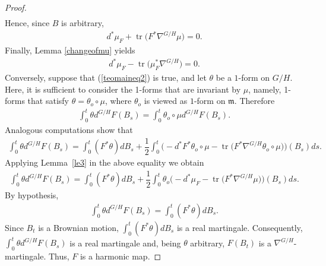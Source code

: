 \documentclass[pdftex]{sigma}
\numberwithin{equation}{section}
\newcommand{\m}{\mathfrak{m}}
\begin{document}
\begin{proof}
\begin{gather*}
  \end{gather*}
  Hence, since $B$ is arbitrary,
  \begin{gather*}
    d^{*}\mu_{F}  +  \operatorname{tr}\big(F^{*} \nabla^{G/H}\mu\big) = 0.
  \end{gather*}
  Finally, Lemma \ref{changeofmu} yields
  \begin{gather}\label{teomaineq2}
    d^{*}\mu_{F}  -  \operatorname{tr}\big(\mu_{F}^* \nabla^{G/H}\big) =0.
  \end{gather}
  Conversely, suppose that (\ref{teomaineq2}) is true, and let $\theta$ be a $1$-form on $G/H$. Here, it is suf\/f\/icient to consider the 1-forms that are invariant by $\mu$, namely, 1-forms that satisfy $\theta = \theta_{o}\circ \mu$, where $\theta_o$ is viewed as $1$-form on  $\m$. Therefore
  \begin{gather*}
    \int_0^t \theta d^{G/H}F(B_{s}) = \int_0^t \theta_{o} \circ \mu  d^{G/H}F(B_{s}).
  \end{gather*}
  Analogous computations show that
  \begin{gather*}
    \int_0^t \theta d^{G/H}F(B_{s}) = \int_0^t (F^{*}\theta) dB_{s} + \dfrac{1}{2}\int_0^t \big({-}d^{*}F^{*}
    \theta_{o}\circ \mu - \operatorname{tr}\big(F^{*} \nabla^{G/H}\theta_{o} \circ \mu\big)\big)(B_{s})ds.
  \end{gather*}
  Applying Lemma~\ref{le3} in the above equality we obtain
  \begin{gather*}
    \int_0^t \theta d^{G/H}F(B_{s}) = \int_0^t (F^{*}\theta) dB_{s} + \dfrac{1}{2}\int_0^t\theta_{o}\big({-}d^{*}\mu_{F}
    - \operatorname{tr}\big(F^{*} \nabla^{G/H}\mu\big)\big)(B_{s}) ds.
  \end{gather*}
  By hypothesis,
  \begin{gather*}
    \int_0^t \theta d^{G/H}F(B_{s}) = \int_0^t (F^{*}\theta) dB_{s}.
  \end{gather*}
  Since $B_t$ is a Brownian motion, $\int_0^t (F^{*}\theta) dB_{s}$ is a real martingale. Consequently,  $\int_0^t \theta d^{G/H}F(B_{s})$ is a real martingale and, being $\theta$ arbitrary, $F(B_{t})$ is a
     $\nabla^{G/H}$-martingale. Thus, $F$ is a  harmonic map.
\end{proof}
\end{document}
